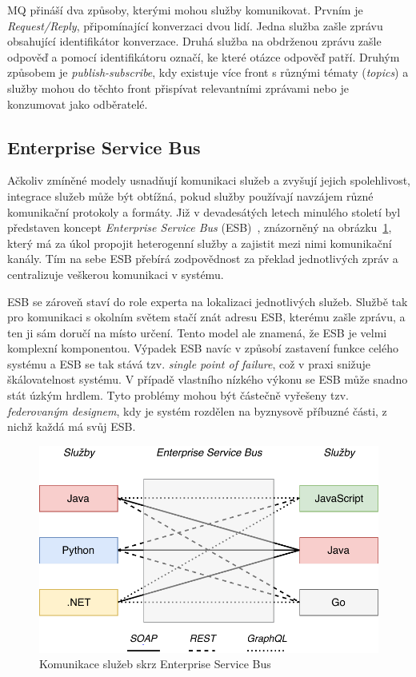 \gls{MQ} přináší dva způsoby, kterými mohou služby komunikovat. Prvním je
\textit{Request/Reply}, připomínající konverzaci dvou lidí. Jedna
služba zašle zprávu obsahující identifikátor konverzace. Druhá služba
na obdrženou zprávu zašle odpověď a pomocí identifikátoru označí,
ke které otázce odpověď patří. Druhým způsobem je \textit{publish-subscribe},
kdy existuje více front s různými tématy (\textit{topics}) a služby mohou
do těchto front přispívat relevantními zprávami nebo je konzumovat jako odběratelé.

\subsection{Enterprise Service Bus}

Ačkoliv zmíněné modely usnadňují komunikaci služeb a zvyšují jejich
spolehlivost, integrace služeb může být obtížná, pokud služby používají navzájem různé
komunikační protokoly a formáty. Již v devadesátých letech minulého století
byl představen koncept \textit{Enterprise Service
Bus} (\gls{ESB})~\cite{chappell2004enterprise},
znázorněný na obrázku~\ref{fig:enterprise-service-bus},
který má za úkol propojit heterogenní služby a zajistit mezi nimi
komunikační kanály. Tím na sebe \gls{ESB} přebírá zodpovědnost za překlad
jednotlivých zpráv a centralizuje veškerou komunikaci v systému.

\gls{ESB} se zároveň staví do role experta na lokalizaci jednotlivých služeb.
Službě tak pro komunikaci s okolním světem stačí znát adresu \gls{ESB}, kterému
zašle zprávu, a ten ji sám doručí na místo určení. Tento model ale
znamená, že \gls{ESB} je velmi komplexní komponentou. Výpadek \gls{ESB} navíc
v způsobí zastavení funkce celého systému a \gls{ESB} se tak stává
tzv. \textit{single point of failure}, což v praxi snižuje škálovatelnost systému.
V případě vlastního nízkého výkonu se \gls{ESB} může snadno stát úzkým hrdlem.
Tyto problémy mohou být částečně vyřešeny tzv. \textit{federovaným designem},
kdy je systém rozdělen na byznysově příbuzné části, z nichž každá má
svůj \gls{ESB}.

\begin{figure}
    \centering
    \includegraphics[keepaspectratio=true, width=0.7\linewidth]{figures/enterprise-service-bus.pdf}
    \caption{Komunikace služeb skrz Enterprise Service Bus}
    \label{fig:enterprise-service-bus}
\end{figure}

